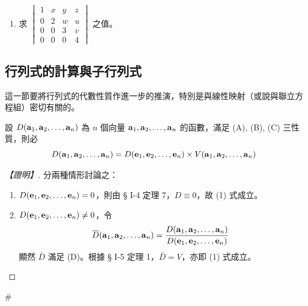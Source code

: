 \begin{enumerate}[label=\arabic*., leftmargin=2em]
\begin{center}
  \end{center}
  在四階以上有無類似結果？試以下式為例計算一下：
  \[ \begin{vmatrix}
  1 & 1 & 0 & 1 \\
  -1 & 1 & 1 & 0 \\
  0 & 1 & 0 & -1 \\
  2 & -1 & 1 & -1
  \end{vmatrix} \]

  \item 求 $\begin{vmatrix}
  1 & x & y & z \\
  0 & 2 & w & u \\
  0 & 0 & 3 & v \\
  0 & 0 & 0 & 4
  \end{vmatrix}$ 之值。
\end{enumerate}

\subsection{行列式的計算與子行列式}\label{sec:b6-1-6}
\resetsectcounters

這一節要將行列式的代數性質作進一步的推演，特別是與線性映射（或說與聯立方程組）密切有關的。

\begin{theorem}\label{thm:b6-1-12}
設 $D(\boldsymbol{\mathbf{a}}_1, \boldsymbol{\mathbf{a}}_2, \dots, \boldsymbol{\mathbf{a}}_n)$ 為 $n$ 個向量 $\boldsymbol{\mathbf{a}}_1, \boldsymbol{\mathbf{a}}_2, \dots, \boldsymbol{\mathbf{a}}_n$ 的函數，滿足 (A), (B), (C) 三性質，則必
\begin{equation}
D(\boldsymbol{\mathbf{a}}_1, \boldsymbol{\mathbf{a}}_2, \dots, \boldsymbol{\mathbf{a}}_n) = D(\boldsymbol{\mathbf{e}}_1, \boldsymbol{\mathbf{e}}_2, \dots, \boldsymbol{\mathbf{e}}_n) \times V(\boldsymbol{\mathbf{a}}_1, \boldsymbol{\mathbf{a}}_2, \dots, \boldsymbol{\mathbf{a}}_n) \label{eq:b6-1-6-1}
\end{equation}
\end{theorem}

\begin{proof}[【證明】]
分兩種情形討論之：
\begin{enumerate}[label=(\roman*), leftmargin=2em]
  \item $D(\boldsymbol{\mathbf{e}}_1, \boldsymbol{\mathbf{e}}_2, \dots, \boldsymbol{\mathbf{e}}_n) = 0$，則由 § I-4 定理 7，$D \equiv 0$，故 (1) 式成立。
  \item $D(\boldsymbol{\mathbf{e}}_1, \boldsymbol{\mathbf{e}}_2, \dots, \boldsymbol{\mathbf{e}}_n) \ne 0$，令
  \[ \overline{D}(\boldsymbol{\mathbf{a}}_1, \boldsymbol{\mathbf{a}}_2, \dots, \boldsymbol{\mathbf{a}}_n) = \dfrac{D(\boldsymbol{\mathbf{a}}_1, \boldsymbol{\mathbf{a}}_2, \dots, \boldsymbol{\mathbf{a}}_n)}{D(\boldsymbol{\mathbf{e}}_1, \boldsymbol{\mathbf{e}}_2, \dots, \boldsymbol{\mathbf{e}}_n)} \]
  顯然 $\bar{D}$ 滿足 (D)。根據 § I-5 定理 1，$\bar{D} = V$，亦即 (1) 式成立。
\end{enumerate}
\end{proof}\hfill$\#$

